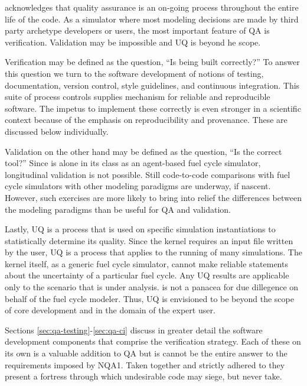 \Cyclus acknowledges that quality assurance is an on-going process throughout the 
entire life of the code. As a simulator where most modeling decisions are made 
by third party archetype developers or users, the most important feature of 
\gls{QA} is verification. Validation may be impossible and \gls{UQ} is beyond 
he scope.

Verification may be defined as the question, ``Is \Cyclus being built correctly?'' 
To answer this question we turn to the software development of notions of testing,
documentation, version control, style guidelines, and continuous integration. 
This suite of process controls supplies mechanism for reliable and reproducible 
software. The impetus to implement these correctly is even stronger in a scientific 
context because of the emphasis on reproducibility and provenance. These are 
discussed below individually.

Validation on the other hand may be defined as the question, 
``Is \Cyclus the correct tool?''
Since \Cyclus is alone in its class as an agent-based fuel cycle simulator, longitudinal 
validation is not possible. Still code-to-code comparisons with fuel cycle
simulators with other modeling paradigms are underway, if nascent. However, such 
exercises are more likely to bring into relief the differences between the modeling
paradigms than be useful for \gls{QA} and validation. 

Lastly, \gls{UQ} is a process that is used on specific simulation
instantiations to statistically determine its quality. Since the \Cyclus 
kernel requires an input file written by the user, \gls{UQ} is a process that applies 
to the running of many \Cyclus simulations. The kernel itself, as a generic fuel cycle 
simulator, cannot make reliable statements about the uncertainty of a particular fuel 
cycle. Any \gls{UQ} results are applicable only to the scenario that is under 
analysis. \Cyclus is not a panacea for due dillegence on behalf of the fuel 
cycle modeler. Thus, \gls{UQ} is envisioned to be beyond the scope of core development 
and in the domain of the expert user.

Sections \ref{sec:qa-testing}-\ref{sec:qa-ci} discuss in greater detail the software 
development components that comprise the \Cyclus verification strategy.
Each of these on its own is a valuable addition to \gls{QA} but is cannot be the 
entire answer to the requirements imposed by \gls{NQA1}. Taken together and strictly 
adhered to they present a fortress through which undesirable code may siege, 
but never take.

